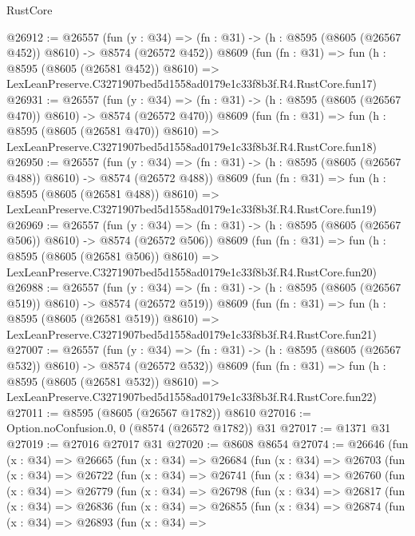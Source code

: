 \begin{lexlean}{RustCore}
\begin{coremodule}
@26912 := @26557
    (fun (y : @34) => (fn : @31) -> (h : @8595 (@8605 (@26567 @452)) @8610) -> @8574 (@26572 @452))
    @8609
    (fun (fn : @31) =>
    fun (h : @8595 (@8605 (@26581 @452)) @8610) =>
    LexLeanPreserve.C3271907bed5d1558ad0179e1c33f8b3f.R4.RustCore.fun17)
@26931 := @26557
    (fun (y : @34) => (fn : @31) -> (h : @8595 (@8605 (@26567 @470)) @8610) -> @8574 (@26572 @470))
    @8609
    (fun (fn : @31) =>
    fun (h : @8595 (@8605 (@26581 @470)) @8610) =>
    LexLeanPreserve.C3271907bed5d1558ad0179e1c33f8b3f.R4.RustCore.fun18)
@26950 := @26557
    (fun (y : @34) => (fn : @31) -> (h : @8595 (@8605 (@26567 @488)) @8610) -> @8574 (@26572 @488))
    @8609
    (fun (fn : @31) =>
    fun (h : @8595 (@8605 (@26581 @488)) @8610) =>
    LexLeanPreserve.C3271907bed5d1558ad0179e1c33f8b3f.R4.RustCore.fun19)
@26969 := @26557
    (fun (y : @34) => (fn : @31) -> (h : @8595 (@8605 (@26567 @506)) @8610) -> @8574 (@26572 @506))
    @8609
    (fun (fn : @31) =>
    fun (h : @8595 (@8605 (@26581 @506)) @8610) =>
    LexLeanPreserve.C3271907bed5d1558ad0179e1c33f8b3f.R4.RustCore.fun20)
@26988 := @26557
    (fun (y : @34) => (fn : @31) -> (h : @8595 (@8605 (@26567 @519)) @8610) -> @8574 (@26572 @519))
    @8609
    (fun (fn : @31) =>
    fun (h : @8595 (@8605 (@26581 @519)) @8610) =>
    LexLeanPreserve.C3271907bed5d1558ad0179e1c33f8b3f.R4.RustCore.fun21)
@27007 := @26557
    (fun (y : @34) => (fn : @31) -> (h : @8595 (@8605 (@26567 @532)) @8610) -> @8574 (@26572 @532))
    @8609
    (fun (fn : @31) =>
    fun (h : @8595 (@8605 (@26581 @532)) @8610) =>
    LexLeanPreserve.C3271907bed5d1558ad0179e1c33f8b3f.R4.RustCore.fun22)
@27011 := @8595 (@8605 (@26567 @1782)) @8610
@27016 := Option.noConfusion.{0, 0} (@8574 (@26572 @1782)) @31
@27017 := @1371 @31
@27019 := @27016 @27017 @31
@27020 := @8608 @8654
@27074 := @26646
    (fun (x : @34) =>
    @26665
      (fun (x : @34) =>
      @26684
        (fun (x : @34) =>
        @26703
          (fun (x : @34) =>
          @26722
            (fun (x : @34) =>
            @26741
              (fun (x : @34) =>
              @26760
                (fun (x : @34) =>
                @26779
                  (fun (x : @34) =>
                  @26798
                    (fun (x : @34) =>
                    @26817
                      (fun (x : @34) =>
                      @26836
                        (fun (x : @34) =>
                        @26855
                          (fun (x : @34) =>
                          @26874
                            (fun (x : @34) =>
                            @26893
                              (fun (x : @34) =>

\end{coremodule}
\end{lexlean}
